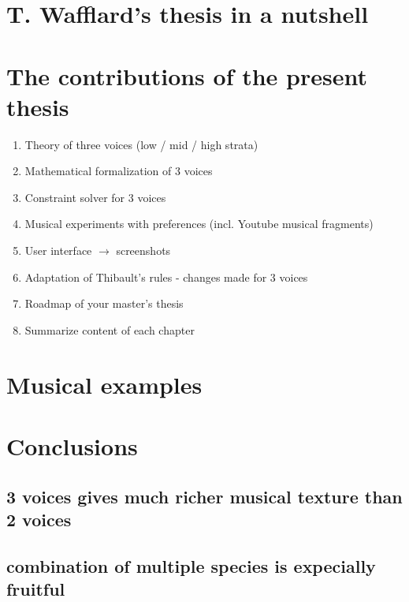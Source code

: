 \section{T. Wafflard's thesis in a nutshell}
\section{The contributions of the present thesis}
\begin{enumerate}
    \item Theory of three voices (low / mid / high strata)
    \item Mathematical formalization of 3 voices
    \item Constraint solver for 3 voices
    \item Musical experiments with preferences (incl. Youtube musical fragments)
    \item User interface $\rightarrow$ screenshots
    \item Adaptation of Thibault's rules - changes made for 3 voices
    \item Roadmap of your master's thesis
    \item Summarize content of each chapter
\end{enumerate}
\section{Musical examples}
\section{Conclusions}
\subsection*{3 voices gives much richer musical texture than 2 voices}
\subsection*{combination of multiple species is expecially fruitful}
